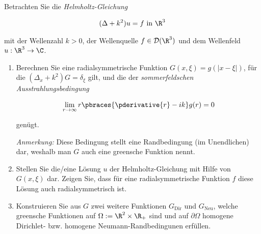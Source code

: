 
\begin{exercise}

Betrachten Sie die \textit{Helmholtz-Gleichung}

\begin{align*}
  (\Delta + k^2) u = f ~\text{in}~ \R^3
\end{align*}

mit der Wellenzahl $k > 0$, der Wellenquelle $f \in \mathcal{D}(\R^3)$ und dem Wellenfeld $u: \R^3 \to \C$.

\begin{enumerate}[label = (\roman*)]

  \item Berechnen Sie eine radialsymmetrische Funktion $G(x, \xi) = g(|x - \xi|)$,
  für die $(\Delta_x + k^2)G = \delta_\xi$ gilt, und die der \textit{sommerfeldschen
  Ausstrahlungsbedingung}

  \begin{align*}
    \lim_{r \to \infty} r \pbraces{\pderivative{r} - i k} g(r) = 0
  \end{align*}

  genügt.

  \textit{Anmerkung:}
  Diese Bedingung stellt eine Randbedingung (im Unendlichen) dar, weshalb man $G$ auch eine greensche Funktion nennt.

  \item Stellen Sie die/eine Lösung $u$ der Helmholtz-Gleichung mit Hilfe von $G(x, \xi)$ dar.
  Zeigen Sie, dass für eine radialsymmetrische Funktion $f$ diese Lösung auch radialsymmetrisch ist.

  \item Konstruieren Sie aus $G$ zwei weitere Funktionen $G_{\mathrm{Dir}}$ und $G_{\mathrm{Neu}}$, welche greensche Funktionen auf $\Omega := \R^2 \times \R_+$ sind und auf $\partial\Omega$ homogene Dirichlet- bzw. homogene Neumann-Randbedingunen erfüllen.

\end{enumerate}

\end{exercise}


